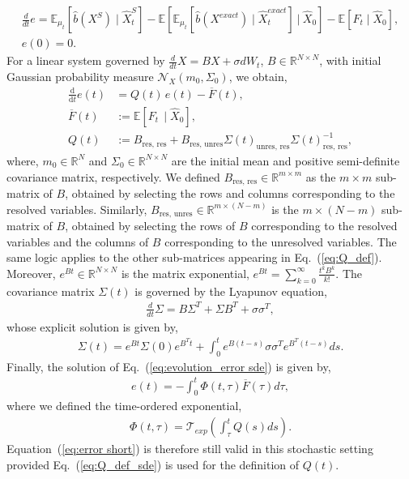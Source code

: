 \documentclass[11pt, a4paper, oneside, reqno]{amsart}
\begin{document}
\begin{eqnarray}
    \frac{d}{dt}e = \mathbb{E}_{\mu_t}[\hat{b}(X^S)\mid\hat{X}^S_t] - \mathbb{E}\left[\mathbb{E}_{\mu_t}[\hat{b}(X^{exact})\mid\hat{X}^{exact}_t] \:\bigg|\: \hat{X}_0 \right] - \mathbb{E}[F_t\mid\hat{X}_0],\\
    e(0)=0.
\end{eqnarray}
For a linear system governed by $\frac{d}{dt}X=BX+\sigma dW_t$, $B \in\mathbb{R}^{N\times N}$, with initial Gaussian probability measure $\mathcal{N}_X(m_0,\Sigma_0)$, we obtain,
\begin{align}
    \frac{\mathrm{d}}{\mathrm{d}t} e(t) 
    &= Q(t)\, e(t) - \overline{F}(t), \label{eq:evolution_error sde} \\
    \overline{F}(t) 
    &:= \mathbb{E} \left[ F_t \,\mid \hat{X}_0 \right], \label{eq:mean_force_stoch} \\
    Q(t) 
    &:= B_{\mathrm{res},\,\mathrm{res}} 
    + B_{\mathrm{res},\,\mathrm{unres}} 
    \Sigma(t)_{\mathrm{unres},\,\mathrm{res}} 
    \Sigma(t)^{-1}_{\mathrm{res},\,\mathrm{res}}, \label{eq:Q_def_sde}
\end{align}
where, $m_0 \in \mathbb{R}^N$ and $\Sigma_0 \in \mathbb{R}^{N\times N}$ are the initial mean and positive semi-definite covariance matrix, respectively.
We defined $B_{\mathrm{res},\,\mathrm{res}} \in \mathbb{R}^{m \times m}$ as the $m\times m$ sub-matrix of $B$, obtained by selecting the rows and columns corresponding to the resolved variables. Similarly, $B_{\mathrm{res},\,\mathrm{unres}} \in\mathbb{R}^{m\times (N-m)}$ is the $m\times (N-m)$ sub-matrix of $B$, obtained by selecting the rows of $B$ corresponding to the resolved variables and the columns of $B$ corresponding to the unresolved variables. The same logic applies to the other sub-matrices appearing in Eq.~(\ref{eq:Q_def}). Moreover, $e^{Bt}\in \mathbb{R}^{N \times N}$ is the matrix exponential, $e^{Bt}=\sum_{k=0}^\infty \frac{t^kB^k}{k!}$.
The covariance matrix $\Sigma(t)$ is governed by the Lyapunov equation,
\begin{eqnarray}
    \frac{d}{dt}\Sigma = B\Sigma^T + \Sigma B^T + \sigma\sigma^T,
\end{eqnarray}
whose explicit solution is given by,
\begin{eqnarray}
    \Sigma(t)=e^{Bt}\Sigma(0)e^{B^Tt} + \int_0^te^{B(t-s)}\sigma\sigma^Te^{B^T(t-s)}ds.
\end{eqnarray}
Finally, the solution of Eq.~(\ref{eq:evolution_error sde}) is given by,
\begin{eqnarray}\label{eq:error analytical sde}
    e(t) = -\int_0^t \Phi(t,\tau) \overline{F}(\tau)  d\tau,
\end{eqnarray}
where we defined the time-ordered exponential,
\begin{eqnarray}
    \Phi(t,\tau) = \mathcal{T}_{exp}\left(  \int_\tau^t Q(s)ds \right).
\end{eqnarray}
Equation~(\ref{eq:error short}) is therefore still valid in this stochastic setting provided Eq.~(\ref{eq:Q_def_sde}) is used for the definition of $Q(t)$.
\end{document}
